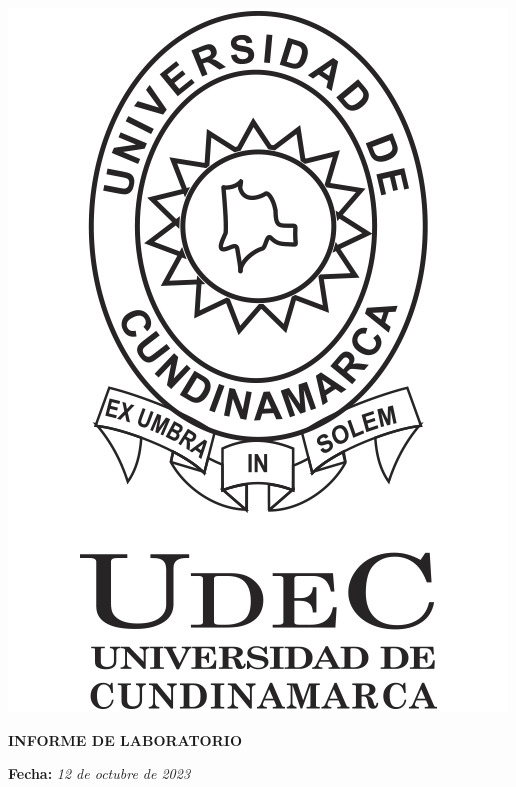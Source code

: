 \onecolumn\begin{@twocolumntrue}
    \begin{minipage}{0.2\textwidth} %
        \centering
        {\includegraphics[scale=0.12]{fig/ucundinamarca.png}} %
    \end{minipage}
    \vspace{10pt}
    \begin{minipage}{0.75\textwidth} %
        \begin{center}
            \vspace{8mm}
        
            \normalsize{\textbf{INFORME DE LABORATORIO }}
            \vspace{2mm}

            \normalsize{\textbf{Fecha: } \textit{12 de octubre de 2023}}
            \vspace{2mm}
            

\end{center}
\end{minipage}
\end{@twocolumntrue}
